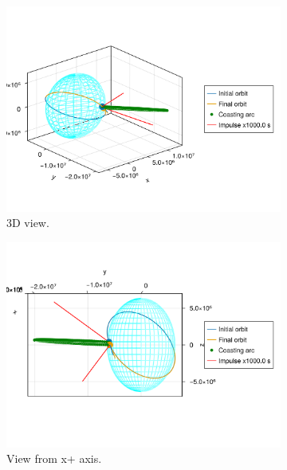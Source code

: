 \begin{figure}[htbp]
    \centering
    \begin{subfigure}{0.49\linewidth}
        \includegraphics[width=\linewidth]{../results/two_body/ipv_noncop/ICI_3d.png}
        \caption{3D view.}
    \end{subfigure}
    \begin{subfigure}{0.49\linewidth}
        \includegraphics[width=\linewidth]{../results/two_body/ipv_noncop/ICI_x+.png}
        \caption{View from x+ axis.}
    \end{subfigure}
    \begin{subfigure}{0.49\linewidth}

\end{subfigure}
\end{figure}

